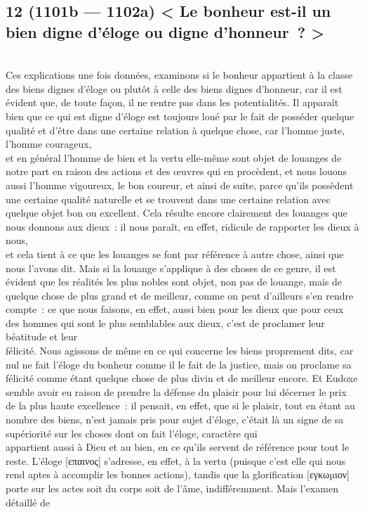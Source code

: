 \documentclass[french,twoside]{book} %
\begin{document}
\subsection[{12 (1101b — 1102a) < Le bonheur est-il un bien digne d’éloge ou digne d’honneur ? >}]{12 (1101b — 1102a) < Le bonheur est-il un bien digne d’éloge ou digne d’honneur ? >}
\noindent \\
Ces explications une fois données, examinons si le bonheur appartient à la classe des biens dignes d’éloge ou plutôt à celle des biens dignes d’honneur, car il est évident que, de toute façon, il ne rentre pas dans les potentialités. Il apparaît bien que ce qui est digne d’éloge est toujours loué par le fait de posséder quelque qualité et d’être dans une certaine relation à quelque chose, car l’homme juste, l’homme courageux, \\
et en général l’homme de bien et la vertu elle-même sont objet de louanges de notre part en raison des actions et des œuvres qui en procèdent, et nous louons aussi l’homme vigoureux, le bon coureur, et ainsi de suite, parce qu’ils possèdent une certaine qualité naturelle et se trouvent dans une certaine relation avec quelque objet bon ou excellent. Cela résulte encore clairement des louanges que nous donnons aux dieux : il nous paraît, en effet, ridicule de rapporter les dieux à nous, \\
et cela tient à ce que les louanges se font par référence à autre chose, ainsi que nous l’avons dit. Mais si la louange s’applique à des choses de ce genre, il est évident que les réalités les plus nobles sont objet, non pas de louange, mais de quelque chose de plus grand et de meilleur, comme on peut d’ailleurs s’en rendre compte : ce que nous faisons, en effet, aussi bien pour les dieux que pour ceux des hommes qui sont le plus semblables aux dieux, c’est de proclamer leur béatitude et leur \\
félicité. Nous agissons de même en ce qui concerne les biens proprement dits, car nul ne fait l’éloge du bonheur comme il le fait de la justice, mais on proclame sa félicité comme étant quelque chose de plus divin et de meilleur encore. Et Eudoxe semble avoir eu raison de prendre la défense du plaisir pour lui décerner le prix de la plus haute excellence : il pensait, en effet, que si le plaisir, tout en étant au nombre des biens, n’est jamais pris pour sujet d’éloge, c’était là un signe de sa supériorité sur les choses dont on fait l’éloge, caractère qui \\
appartient aussi à Dieu et au bien, en ce qu’ils servent de référence pour tout le reste. L’éloge [επαινος] s’adresse, en effet, à la vertu (puisque c’est elle qui nous rend aptes à accomplir les bonnes actions), tandis que la glorification [εγκωµιον] porte sur les actes soit du corps soit de l’âme, indifféremment. Mais l’examen détaillé de \\
\end{document}
